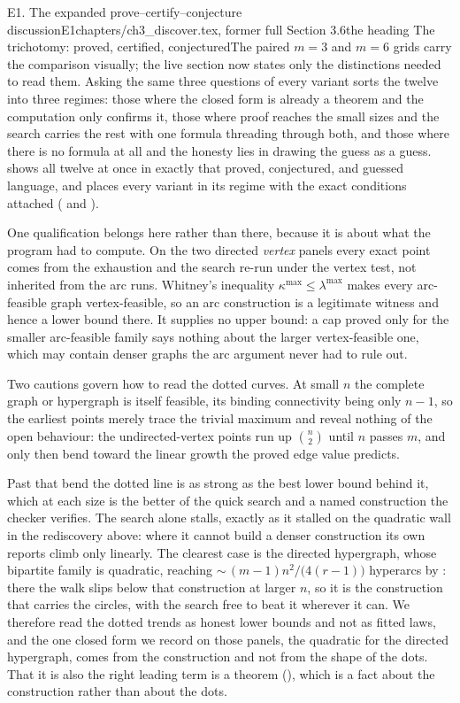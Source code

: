 \begin{offcut}{E1. The expanded prove--certify--conjecture discussion}{E1}{chapters/ch3\_discover.tex, former full Section 3.6}{the heading The trichotomy: proved, certified, conjectured}{The paired $m=3$ and $m=6$ grids carry the comparison visually; the live section now states only the distinctions needed to read them.}
Asking the same three questions of every variant sorts the twelve into three regimes: those where the closed form is already a theorem and the computation only confirms it, those where proof reaches the small sizes and the search carries the rest with one formula threading through both, and those where there is no formula at all and the honesty lies in drawing the guess as a guess.  shows all twelve at once in exactly that proved, conjectured, and guessed language, and  places every variant in its regime with the exact conditions attached ( and ).

One qualification belongs here rather than there, because it is about what the program had to compute. On the two directed \emph{vertex} panels every exact point comes from the exhaustion and the search re-run under the vertex test, not inherited from the arc runs. Whitney's inequality $\kappa^{\max} \le \lambda^{\max}$ makes every arc-feasible graph vertex-feasible, so an arc construction is a legitimate witness and hence a lower bound there. It supplies no upper bound: a cap proved only for the smaller arc-feasible family says nothing about the larger vertex-feasible one, which may contain denser graphs the arc argument never had to rule out.

Two cautions govern how to read the dotted curves. At small $n$ the complete graph or hypergraph is itself feasible, its binding connectivity being only $n - 1$, so the earliest points merely trace the trivial maximum and reveal nothing of the open behaviour: the undirected-vertex points run up $\binom{n}{2}$ until $n$ passes $m$, and only then bend toward the linear growth the proved edge value predicts.

Past that bend the dotted line is as strong as the best lower bound behind it, which at each size is the better of the quick search and a named construction the checker verifies. The search alone stalls, exactly as it stalled on the quadratic wall in the rediscovery above: where it cannot build a denser construction its own reports climb only linearly. The clearest case is the directed hypergraph, whose bipartite family is quadratic, reaching ${\sim}\,(m-1)n^2/\bigl(4(r-1)\bigr)$ hyperarcs by : there the walk slips below that construction at larger $n$, so it is the construction that carries the circles, with the search free to beat it wherever it can. We therefore read the dotted trends as honest lower bounds and not as fitted laws, and the one closed form we record on those panels, the quadratic for the directed hypergraph, comes from the construction and not from the shape of the dots. That it is also the right leading term is a theorem (), which is a fact about the construction rather than about the dots.


\end{offcut}
